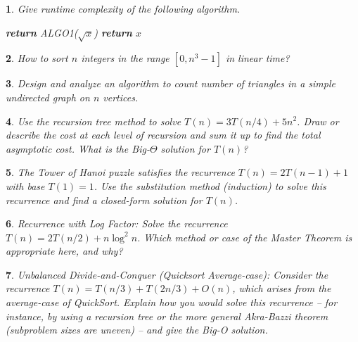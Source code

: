 \documentclass[%
addpoints]{exam}
\theoremstyle{problem}
\newtheorem{p}{}
\begin{document}
\begin{p}
Give runtime complexity of the following algorithm.
\begin{algorithm}[!ht]
	\label{algo1}
	\begin{algorithmic}
		 
		\State \textbf{return} ALGO1($\sqrt{x}$)
		\Else
		\State \textbf{return} $x$
		\EndIf
		\EndProcedure
	\end{algorithmic}
\end{algorithm}
\hfill \end{p}

\begin{p}
How to sort $n$ integers in the range $[0,n^3-1]$ in linear time?
\hfill \end{p}

\begin{p}
Design and analyze an algorithm to count number of triangles in a simple undirected graph on $n$ vertices.
\hfill \end{p}

\begin{p}
Use the recursion tree method to solve \(T(n) = 3T(n/4) + 5n^2\). Draw or describe the cost at each level of recursion and sum it up to find the total asymptotic cost. What is the Big-\(\Theta\) solution for \(T(n)\)?  
\hfill\end{p}

\begin{p}
The Tower of Hanoi puzzle satisfies the recurrence \(T(n) = 2T(n-1) + 1\) with base \(T(1) = 1\). Use the substitution method (induction) to solve this recurrence and find a closed-form solution for \(T(n)\).  
\hfill\end{p}

\begin{p}
Recurrence with Log Factor: Solve the recurrence \(T(n) = 2T(n/2) + n \log^2 n\). Which method or case of the Master Theorem is appropriate here, and why?  
\hfill\end{p}

\begin{p}
Unbalanced Divide-and-Conquer (Quicksort Average-case): Consider the recurrence \(T(n) = T(n/3) + T(2n/3) + O(n)\), which arises from the average-case of QuickSort. Explain how you would solve this recurrence – for instance, by using a recursion tree or the more general Akra-Bazzi theorem (subproblem sizes are uneven) – and give the Big-O solution.  
\hfill\end{p}
\end{document}
